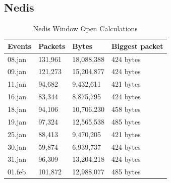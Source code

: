 \newpage
\subsection{Nedis}

\begin{table}[H]
\centering
\caption{Nedis Window Open Calculations}
\label{tab:NedisWindowCalculations}
    \begin{tabular}{|l|l|l|l|}
        \hline
        \textbf{Events} & \textbf{Packets} & \textbf{Bytes} & \textbf{Biggest packet} \\ \hline
        08.jan          & 131,961          & 18,088,388     & 424 bytes               \\ \hline
        09.jan          & 121,273          & 15,204,877     & 424 bytes               \\ \hline
        11.jan          & 94,682           & 9,432,611      & 421 bytes               \\ \hline
        16.jan          & 83,344           & 8,875,795      & 424 bytes               \\ \hline
        18.jan          & 94,106           & 10,706,230     & 458 bytes               \\ \hline
        19.jan          & 97,324           & 12,565,538     & 485 bytes               \\ \hline
        25.jan          & 88,413           & 9,470,205      & 421 bytes               \\ \hline
        30.jan          & 59,874           & 6,939,737      & 424 bytes               \\ \hline
        31.jan          & 96,309           & 13,204,218     & 424 bytes               \\ \hline
        01.feb          & 101,872          & 12,988,077     & 485 bytes               \\ \hline
    \end{tabular}
\end{table}

